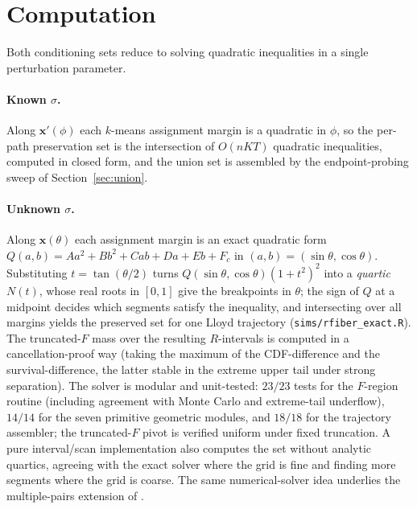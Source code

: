 \documentclass[11pt]{article}
\newcommand{\x}{\mathbf{x}}
\begin{document}
\section{Computation}
\label{sec:computation}

Both conditioning sets reduce to solving quadratic inequalities in a single
perturbation parameter.

\paragraph{Known $\sigma$.} Along $\x'(\phi)$ each $k$-means
assignment margin is a quadratic in $\phi$, so the per-path preservation set is
the intersection of $O(nKT)$ quadratic inequalities, computed in closed form, and
the union set is assembled by the endpoint-probing sweep of
Section~\ref{sec:union}.

\paragraph{Unknown $\sigma$.} Along $\x(\theta)$ each assignment
margin is an exact quadratic form
$Q(a,b)=Aa^2+Bb^2+Cab+Da+Eb+F_c$ in $(a,b)=(\sin\theta,\cos\theta)$.
Substituting $t=\tan(\theta/2)$ turns $Q(\sin\theta,\cos\theta)(1+t^2)^2$ into a
\emph{quartic} $N(t)$, whose real roots in $[0,1]$ give the breakpoints in
$\theta$; the sign of $Q$ at a midpoint decides which segments satisfy the
inequality, and intersecting over all margins yields the preserved set for one
Lloyd trajectory (\texttt{sims/rfiber\_exact.R}). The truncated-$F$ mass over the
resulting $R$-intervals is computed in a cancellation-proof way (taking the
maximum of the CDF-difference and the survival-difference, the latter stable in
the extreme upper tail under strong separation). The solver is modular and
unit-tested: $23/23$ tests for the $F$-region routine (including agreement with
Monte Carlo and extreme-tail underflow), $14/14$ for the seven primitive
geometric modules, and $18/18$ for the trajectory assembler; the truncated-$F$
pivot is verified uniform under fixed truncation.
A pure interval/scan implementation also computes the set without analytic
quartics, agreeing with the exact solver where the grid is fine and finding more
segments where the grid is coarse.
The same numerical-solver idea underlies the multiple-pairs extension of
\citet{yun2024multiplepairs}.
\end{document}
